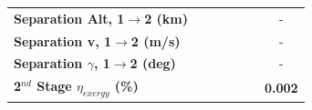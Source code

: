 \begin{table}[ht]
\begin{tabular}{l c c c c c c}
		\textbf{Separation Alt, 1$\rightarrow$2 (km)}
		& \firstsecondSeparationAltTThreeNinetyNoReturn
		& \firstsecondSeparationAltTThreeNinetyFiveNoReturn
		& \firstsecondSeparationAltTThreeStandardNoReturn
		& \firstsecondSeparationAltTThreeOneHundredFiveNoReturn
		& \firstsecondSeparationAltTThreeOneHundredTenNoReturn
		& -
		\\
		\textbf{Separation v, 1$\rightarrow$2 (m/s)}
		& \firstsecondSeparationvTThreeNinetyNoReturn
		& \firstsecondSeparationvTThreeNinetyFiveNoReturn
		& \firstsecondSeparationvTThreeStandardNoReturn
		& \firstsecondSeparationvTThreeOneHundredFiveNoReturn
		& \firstsecondSeparationvTThreeOneHundredTenNoReturn
		& -
		\\
		\textbf{Separation $\gamma$, 1$\rightarrow$2 (deg)}
		& \firstsecondSeparationgammaTThreeNinetyNoReturn
		& \firstsecondSeparationgammaTThreeNinetyFiveNoReturn
		& \firstsecondSeparationgammaTThreeStandardNoReturn
		& \firstsecondSeparationgammaTThreeOneHundredFiveNoReturn
		& \firstsecondSeparationgammaTThreeOneHundredTenNoReturn
		& -
		\\
		\hline 
		\textbf{2$^{nd}$ Stage $\eta_{exergy}$ (\%)}
		& \textbf{\secondExergyEffTThreeNinetyNoReturn}
		& \textbf{\secondExergyEffTThreeNinetyFiveNoReturn}
		& \textbf{\secondExergyEffTThreeStandardNoReturn}
		& \textbf{\secondExergyEffTThreeOneHundredFiveNoReturn}
		& \textbf{\secondExergyEffTThreeOneHundredTenNoReturn}
		& \textbf{0.002}
		\\
	

\end{tabular}
\end{table}
